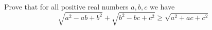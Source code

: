 Prove that for all positive real numbers $a,b,c$ we have\[\sqrt{a^2-ab+b^2}+\sqrt{b^2-bc+c^2}\ge\sqrt{a^2+ac+c^2} \]